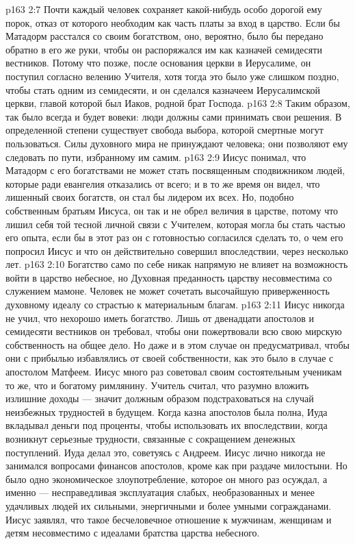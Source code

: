 \vs p163 2:7 \pc Почти каждый человек сохраняет какой\hyp{}нибудь особо дорогой ему порок, отказ от которого необходим как часть платы за вход в царство. Если бы Матадорм расстался со своим богатством, оно, вероятно, было бы передано обратно в его же руки, чтобы он распоряжался им как казначей семидесяти вестников. Потому что позже, после основания церкви в Иерусалиме, он поступил согласно велению Учителя, хотя тогда это было уже слишком поздно, чтобы стать одним из семидесяти, и он сделался казначеем Иерусалимской церкви, главой которой был Иаков, родной брат Господа.
\vs p163 2:8 Таким образом, так было всегда и будет вовеки: люди должны сами принимать свои решения. В определенной степени существует свобода выбора, которой смертные могут пользоваться. Силы духовного мира не принуждают человека; они позволяют ему следовать по пути, избранному им самим.
\vs p163 2:9 Иисус понимал, что Матадорм с его богатствами не может стать посвященным сподвижником людей, которые ради евангелия отказались от всего; и в то же время он видел, что лишенный своих богатств, он стал бы лидером их всех. Но, подобно собственным братьям Иисуса, он так и не обрел величия в царстве, потому что лишил себя той тесной личной связи с Учителем, которая могла бы стать частью его опыта, если бы в этот раз он с готовностью согласился сделать то, о чем его попросил Иисус и что он действительно совершил впоследствии, через несколько лет.
\vs p163 2:10 Богатство само по себе никак напрямую не влияет на возможность войти в царство небесное, но  Духовная преданность царству несовместима со служением мамоне. Человек не может сочетать высочайшую приверженность духовному идеалу со страстью к материальным благам.
\vs p163 2:11 Иисус никогда не учил, что нехорошо иметь богатство. Лишь от двенадцати апостолов и семидесяти вестников он требовал, чтобы они пожертвовали всю свою мирскую собственность на общее дело. Но даже и в этом случае он предусматривал, чтобы они с прибылью избавлялись от своей собственности, как это было в случае с апостолом Матфеем. Иисус много раз советовал своим состоятельным ученикам то же, что и богатому римлянину. Учитель считал, что разумно вложить излишние доходы --- значит должным образом подстраховаться на случай неизбежных трудностей в будущем. Когда казна апостолов была полна, Иуда вкладывал деньги под проценты, чтобы использовать их впоследствии, когда возникнут серьезные трудности, связанные с сокращением денежных поступлений. Иуда делал это, советуясь с Андреем. Иисус лично никогда не занимался вопросами финансов апостолов, кроме как при раздаче милостыни. Но было одно экономическое злоупотребление, которое он много раз осуждал, а именно --- несправедливая эксплуатация слабых, необразованных и менее удачливых людей их сильными, энергичными и более умными согражданами. Иисус заявлял, что такое бесчеловечное отношение к мужчинам, женщинам и детям несовместимо с идеалами братства царства небесного.
